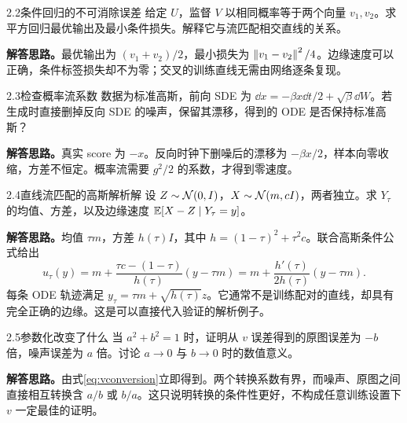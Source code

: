 \begin{exercisebox}{2.2\quad 条件回归的不可消除误差}
给定 $U$，监督 $V$ 以相同概率等于两个向量 $v_1,v_2$。求平方回归最优输出及最小条件损失。解释它与流匹配相交直线的关系。
\end{exercisebox}
\textbf{解答思路。}最优输出为 $(v_1+v_2)/2$，最小损失为 $\left\lVert v_1-v_2\right\rVert^2/4$。边缘速度可以正确，条件标签损失却不为零；交叉的训练直线无需由网络逐条复现。

\begin{exercisebox}{2.3\quad 检查概率流系数}
数据为标准高斯，前向 SDE 为 $\dd x=-\beta x\dd t/2+\sqrt\beta\dd W$。若生成时直接删掉反向 SDE 的噪声，保留其漂移，得到的 ODE 是否保持标准高斯？
\end{exercisebox}
\textbf{解答思路。}真实 score 为 $-x$。反向时钟下删噪后的漂移为 $-\beta x/2$，样本向零收缩，方差不恒定。概率流需要 $g^2/2$ 的系数，才得到零速度。

\begin{exercisebox}{2.4\quad 直线流匹配的高斯解析解}
设 $Z\sim\mathcal{N}(0,I)$，$X\sim\mathcal{N}(m,cI)$，两者独立。求 $Y_\tau$ 的均值、方差，以及边缘速度 $\mathbb{E}[X-Z\mid Y_\tau=y]$。
\end{exercisebox}
\textbf{解答思路。}均值 $\tau m$，方差 $h(\tau)I$，其中 $h=(1-\tau)^2+\tau^2c$。联合高斯条件公式给出
\begin{equation}
 u_\tau(y)=m+\frac{\tau c-(1-\tau)}{h(\tau)}(y-\tau m)
 =m+\frac{h'(\tau)}{2h(\tau)}(y-\tau m).
\end{equation}
每条 ODE 轨迹满足 $y_\tau=\tau m+\sqrt{h(\tau)}z$。它通常不是训练配对的直线，却具有完全正确的边缘。这是可以直接代入验证的解析例子。

\begin{exercisebox}{2.5\quad 参数化改变了什么}
当 $a^2+b^2=1$ 时，证明从 $v$ 误差得到的原图误差为 $-b$ 倍，噪声误差为 $a$ 倍。讨论 $a\to0$ 与 $b\to0$ 时的数值意义。
\end{exercisebox}
\textbf{解答思路。}由式\eqref{eq:vconversion}立即得到。两个转换系数有界，而噪声、原图之间直接相互转换含 $a/b$ 或 $b/a$。这只说明转换的条件性更好，不构成任意训练设置下 $v$ 一定最佳的证明。

